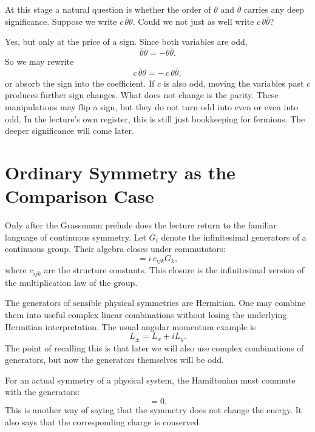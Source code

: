 At this stage a natural question is whether the order of \(\theta\) and \(\bar\theta\) carries any deep significance. Suppose we write \(c\,\bar\theta\theta\). Could we not just as well write \(c\,\theta\bar\theta\)?

Yes, but only at the price of a sign. Since both variables are odd,
\begin{equation}
\bar\theta\theta=-\theta\bar\theta.
\end{equation}
So we may rewrite
\begin{equation}
c\,\bar\theta\theta=-\,c\,\theta\bar\theta,
\end{equation}
or absorb the sign into the coefficient. If \(c\) is also odd, moving the variables past \(c\) produces further sign changes. What does not change is the parity. These manipulations may flip a sign, but they do not turn odd into even or even into odd. In the lecture's own register, this is still just bookkeeping for fermions. The deeper significance will come later.

\section{Ordinary Symmetry as the Comparison Case}

Only after the Grassmann prelude does the lecture return to the familiar language of continuous symmetry. Let \(G_i\) denote the infinitesimal generators of a continuous group. Their algebra closes under commutators:
\begin{equation}
[G_i,G_j]=i\,c_{ijk}G_k,
\end{equation}
where \(c_{ijk}\) are the structure constants. This closure is the infinitesimal version of the multiplication law of the group.

The generators of sensible physical symmetries are Hermitian. One may combine them into useful complex linear combinations without losing the underlying Hermitian interpretation. The usual angular momentum example is
\begin{equation}
L_\pm=L_x\pm iL_y.
\end{equation}
The point of recalling this is that later we will also use complex combinations of generators, but now the generators themselves will be odd.

For an actual symmetry of a physical system, the Hamiltonian must commute with the generators:
\begin{equation}
[H,G_i]=0.
\end{equation}
This is another way of saying that the symmetry does not change the energy. It also says that the corresponding charge is conserved.

